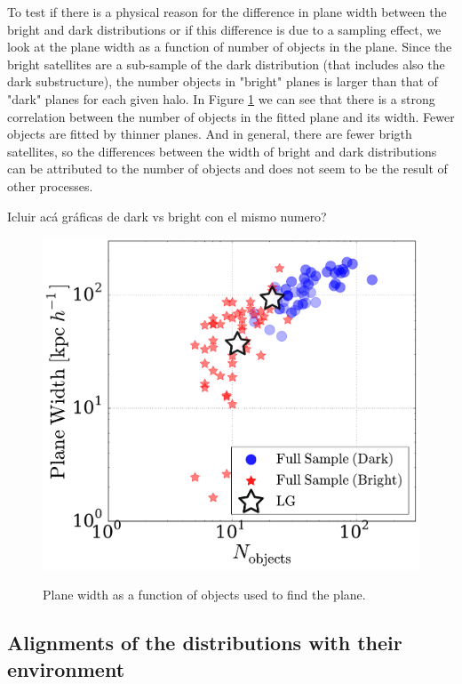To test if there is a physical reason for the difference in plane width between the bright and dark distributions or if this difference is due to a sampling effect, we look at the plane width as a function of number of objects in the plane. 
Since the bright satellites are a sub-sample of the dark distribution (that includes also the dark substructure), the number objects in "bright" planes is larger than that of "dark" planes for each given halo. 
In Figure \ref{fig:plane_width_nobjects} we can see that there is a strong correlation between the number of objects in the fitted plane and its width. Fewer objects are fitted by thinner planes. And in general, there are fewer brigth satellites, so the differences between the width of bright and dark distributions can be attributed to the number of objects and does not seem to be the result of other processes.

{\color{red} Icluir acá gráficas de dark vs bright con el mismo numero?}

\begin{figure}
\includegraphics[width=\hsize]{plane_width_n_dark.pdf}\\
\caption{Plane width as a function of objects used to find the plane.}
\label{fig:plane_width_nobjects}
\end{figure}

\subsection{Alignments of the distributions with their environment}
\label{AlignemntH1H2_sats}

